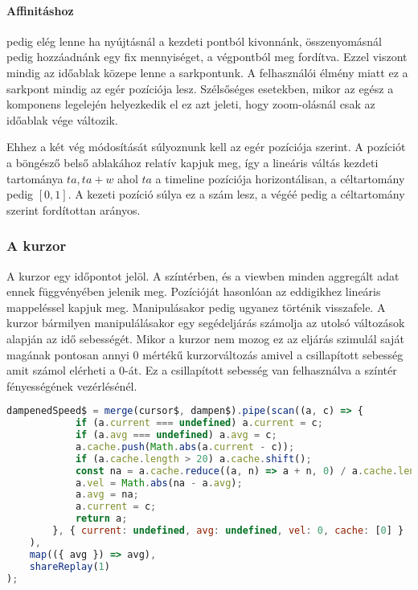 \paragraph{Affinitáshoz} pedig elég lenne ha nyújtásnál a kezdeti pontból kivonnánk, összenyomásnál pedig hozzáadnánk egy fix mennyiséget, a végpontból meg fordítva. Ezzel viszont mindig az időablak közepe lenne a sarkpontunk. A felhasználói élmény miatt ez a sarkpont mindig az egér pozíciója lesz. Szélsőséges esetekben, mikor az egész a komponens legelején helyezkedik el ez azt jeleti, hogy zoom-olásnál csak az időablak vége változik.

Ehhez a két vég módosítását súlyoznunk kell az egér pozíciója szerint. A pozíciót a böngésző belső ablakához relatív kapjuk meg, így a lineáris váltás kezdeti tartománya ${ta, ta + w}$ ahol $ta$ a timeline pozíciója horizontálisan, a céltartomány pedig $[0, 1]$. A kezeti pozíció súlya ez a szám lesz, a végéé pedig a céltartomány szerint fordítottan arányos.

\subsubsection{A kurzor}

A kurzor egy időpontot jelöl. A színtérben, és a viewben minden aggregált adat ennek függvényében jelenik meg. Pozícióját hasonlóan az eddigikhez lineáris mappeléssel kapjuk meg. Manipulásakor pedig ugyanez történik visszafele. A kurzor bármilyen manipulálásakor egy segédeljárás számolja az utolsó változások alapján az idő sebességét. Mikor a kurzor nem mozog ez az eljárás szimulál saját magának pontosan annyi $0$ mértékű kurzorváltozás amivel a csillapított sebesség amit számol elérheti a $0$-át. Ez a csillapított sebesség van felhasználva a színtér fényességének vezérlésénél.

\begin{lstlisting}[language={JavaScript}]
dampenedSpeed$ = merge(cursor$, dampen$).pipe(scan((a, c) => {
			if (a.current === undefined) a.current = c;
			if (a.avg === undefined) a.avg = c;
			a.cache.push(Math.abs(a.current - c));
			if (a.cache.length > 20) a.cache.shift();
			const na = a.cache.reduce((a, n) => a + n, 0) / a.cache.length;
			a.vel = Math.abs(na - a.avg);
			a.avg = na;
			a.current = c;
			return a;
		}, { current: undefined, avg: undefined, vel: 0, cache: [0] }
	),
	map(({ avg }) => avg),
	shareReplay(1)
);
\end{lstlisting}


